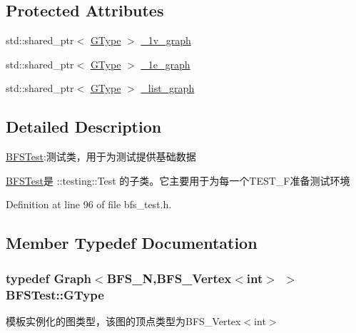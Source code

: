 \subsection*{Protected Attributes}
\begin{DoxyCompactItemize}
\item 
std\+::shared\+\_\+ptr$<$ \hyperlink{class_b_f_s_test_ad38ca5029d5674d467dc71d13f5e5c7c}{G\+Type} $>$ \hyperlink{class_b_f_s_test_a0d7cdb7946902c8d93945a35a222b9d7}{\+\_\+1v\+\_\+graph}
\item 
std\+::shared\+\_\+ptr$<$ \hyperlink{class_b_f_s_test_ad38ca5029d5674d467dc71d13f5e5c7c}{G\+Type} $>$ \hyperlink{class_b_f_s_test_a0158014634e67e6bee3f8f6b1e622ced}{\+\_\+1e\+\_\+graph}
\item 
std\+::shared\+\_\+ptr$<$ \hyperlink{class_b_f_s_test_ad38ca5029d5674d467dc71d13f5e5c7c}{G\+Type} $>$ \hyperlink{class_b_f_s_test_aacf800be44976478c190b2acd338377f}{\+\_\+list\+\_\+graph}
\end{DoxyCompactItemize}


\subsection{Detailed Description}
\hyperlink{class_b_f_s_test}{B\+F\+S\+Test}\+:测试类，用于为测试提供基础数据 

{\ttfamily \hyperlink{class_b_f_s_test}{B\+F\+S\+Test}}是 {\ttfamily \+::testing\+::\+Test} 的子类。它主要用于为每一个{\ttfamily T\+E\+S\+T\+\_\+\+F}准备测试环境 

Definition at line 96 of file bfs\+\_\+test.\+h.



\subsection{Member Typedef Documentation}
\hypertarget{class_b_f_s_test_ad38ca5029d5674d467dc71d13f5e5c7c}{}
\subsubsection[{G\+Type}]{\setlength{\rightskip}{0pt plus 5cm}typedef {\bf Graph}$<${\bf B\+F\+S\+\_\+\+N},{\bf B\+F\+S\+\_\+\+Vertex}$<$int$>$ $>$ {\bf B\+F\+S\+Test\+::\+G\+Type}}\label{class_b_f_s_test_ad38ca5029d5674d467dc71d13f5e5c7c}
模板实例化的图类型，该图的顶点类型为{\ttfamily B\+F\+S\+\_\+\+Vertex$<$int$>$} 

